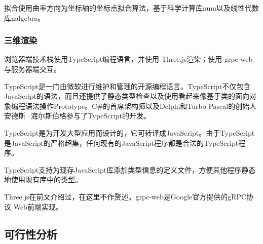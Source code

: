 拟合使用曲率方向为坐标轴的坐标点拟合算法，基于科学计算库num以及线性代数库nalgebra。

\subsubsection{三维渲染}

浏览器端技术栈使用TypeScript编程语言，并使用 Three.js渲染；使用 grpc-web 与服务器端交互。

TypeScript是一门由微软进行维护和管理的开源编程语言。TypeScript不仅包含JavaScript的语法，而且还提供了静态类型检查以及使用看起来像基于类的面向对象编程语法操作Prototype。C\#的首席架构师以及Delphi和Turbo Pascal的创始人安德斯·海尔斯伯格参与了TypeScript的开发。

TypeScript是为开发大型应用而设计的，它可转译成JavaScript。由于TypeScript是JavaScript的严格超集，任何现有的JavaScript程序都是合法的TypeScript程序。

TypeScript支持为现存JavaScript库添加类型信息的定义文件，方便其他程序静态地使用现有库中的类型。

Three.js在前文介绍过，在这里不作赘述。grpc-web是Google官方提供的gRPC协议 Web前端实现。

\subsection{可行性分析}
